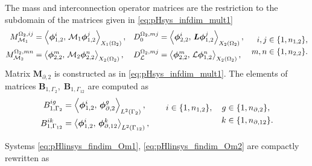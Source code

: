 The mass and interconnection operator matrices are the restriction to the subdomain of the matrices given in \eqref{eq:pHsys_infdim_mult1}
\begin{equation}
\begin{aligned}
{M}_{\mathcal{M}_1}^{\Omega_2, ij} &= \inner[X_1(\Omega_2)]{\bm{\phi}_{1, 2}^i}{\mathcal{M}_1\bm{\phi}_{1, 2}^j}, \\
{M}_{\mathcal{M}_2}^{\Omega_2, mn} &= \inner[X_2(\Omega_2)]{\bm{\phi}_{2, 2}^m}{\mathcal{M}_2\bm{\phi}_{2, 2}^n}, 
\end{aligned} \quad 
\begin{aligned}
{D}_{0}^{\Omega_2, mj} &= \inner[X_2(\Omega_2)]{\bm{\phi}_{2, 2}^i}{\bm{L}\bm{\phi}_{1, 2}^j}, \\
{D}_{\mathcal{L}}^{\Omega_2, mj} &= \inner[X_2(\Omega_2)]{\bm{\phi}_{2, 2}^m}{\mathcal{L}\bm{\phi}_{1, 2}^n}, 
\end{aligned}\quad
\begin{aligned}
i,j &\in \{1,n_{1, 2}\}, \\
m,n &\in \{1,n_{2, 2}\}.
\end{aligned}
\end{equation} 
Matrix $\mathbf{M}_{\partial, 2}$ is constructed as in \eqref{eq:pHsys_infdim_mult1}. The elements of matrices  $\mathbf{B}_{1, \Gamma_2}, \; \mathbf{B}_{1, \Gamma_{12}}$ are computed as
\begin{equation}
\begin{aligned}
{B}_{1, \Gamma_{2}}^{ig} &= \inner[L^2(\Gamma_{2})]{\bm{\phi}_{1, 2}^i}{\bm{\phi}_{\partial, 2}^g},  \\
{B}_{1, \Gamma_{12}}^{ik} &= \inner[L^2(\Gamma_{12})]{\bm{\phi}_{1, 2}^i}{\bm{\phi}_{\partial, 12}^k}, 
\end{aligned} \qquad 
\begin{aligned}
i \in \{1,n_{1, 2}\}, \quad g &\in \{1,n_{\partial, 2}\}, \\
k &\in \{1,n_{\partial, 12}\}.
\end{aligned}
\end{equation} 

Systems \eqref{eq:pHlinsys_findim_Om1}, \eqref{eq:pHlinsys_findim_Om2} are compactly rewritten as 

